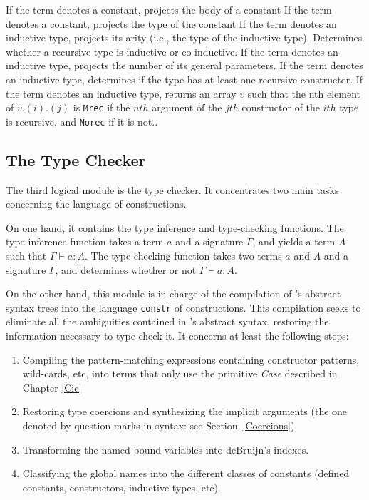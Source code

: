 \begin{description}
    {If the term denotes a constant, projects the body of a constant}
    {If the term denotes a constant, projects the type of the constant}
    {If the term denotes an inductive type, projects its arity (i.e.,
     the type of the inductive type).}
    {Determines whether a recursive type is inductive or co-inductive.}
    {If the term denotes an inductive type, projects the number of 
     its general parameters.}
    {If the term denotes an inductive type, 
     determines if the type has at least one recursive constructor. }
    {If the term denotes an inductive type, returns an array $v$ such 
     that the nth element of $v.(i).(j)$ is
    \texttt{Mrec} if the $nth$ argument of the $jth$ constructor of
    the $ith$ type is recursive, and \texttt{Norec} if it is not.}.
\end{description}

\subsection[The Type Checker]{The Type Checker\label{TypeChecker}}

The third logical module is the type checker. It concentrates two main
tasks concerning the language of constructions.

On one hand, it contains the type inference and type-checking
functions.  The type inference function takes a term
$a$ and a signature $\Gamma$, and yields a term $A$ such that
$\Gamma \vdash a:A$.  The type-checking function takes two terms $a$
and $A$ and a signature $\Gamma$, and determines whether or not
$\Gamma \vdash a:A$.

On the other hand, this module is in charge of the compilation of
\Coq's abstract syntax trees into the language \texttt{constr} of
constructions. This compilation seeks to eliminate all the ambiguities
contained in \Coq's abstract syntax, restoring the information
necessary to type-check it.  It concerns at least the following steps:
\begin{enumerate}
\item Compiling the pattern-matching expressions containing 
constructor patterns, wild-cards, etc, into terms that only
use the primitive \textsl{Case} described in Chapter \ref{Cic}
\item Restoring type coercions and synthesizing the implicit arguments
(the one denoted by question marks in
{\Coq} syntax: see Section~\ref{Coercions}).
\item Transforming the named bound variables into deBruijn's indexes.
\item Classifying the global names into the different classes of
constants (defined constants, constructors, inductive types, etc).
\end{enumerate}

